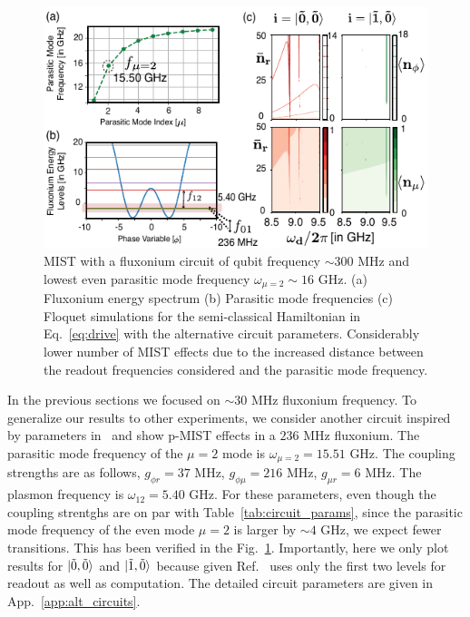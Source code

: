 \documentclass[%
reprint,
superscriptaddress,
 amsmath,amssymb,
 aps,
 prx,
longbibliography,
floatfix,
]{revtex4-2}
\begin{document}
\begin{figure}[htb]
    \centering
    \includegraphics[width=\linewidth]{Figures/Floquet_Will.pdf}
    \caption{MIST with a fluxonium circuit of qubit frequency $\sim 300$ MHz and lowest even parasitic mode frequency $\omega_{\mu=2}\sim 16$ GHz. (a) Fluxonium energy spectrum (b) Parasitic mode frequencies (c) Floquet simulations for the semi-classical Hamiltonian in Eq.~\ref{eq:drive} with the alternative circuit parameters. Considerably lower number of MIST effects due to the increased distance between the readout frequencies considered and the parasitic mode frequency.}
    \label{fig:Floquet1}
\end{figure}

In the previous sections we focused on $\sim 30$ MHz fluxonium frequency. To generalize our results to other experiments, we consider another circuit inspired by parameters in~\cite{ding_high-fidelity_2023} and show p-MIST effects in a $236$ MHz fluxonium. The parasitic mode frequency of the $\mu=2$ mode is $\omega_{\mu=2}=15.51$ GHz. The coupling strengths are as follows, $g_{\phi r}=37$ MHz, $g_{\phi\mu}=216$ MHz, $g_{\mu r}=6$ MHz. The plasmon frequency is $\omega_{12}=5.40$ GHz. For these parameters, even though the coupling strentghs are on par with Table~\ref{tab:circuit_params}, since the parasitic mode frequency of the even mode $\mu=2$ is larger by $\sim 4$ GHz, we expect fewer transitions. This has been verified in the Fig.~\ref{fig:Floquet1}. Importantly, here we only plot results for $\ket{\tilde{0},\tilde{0}}$ and $\ket{\tilde{1},\tilde{0}}$ because given Ref.~\cite{ding_high-fidelity_2023} uses only the first two levels for readout as well as computation. The detailed circuit parameters are given in App.~\ref{app:alt_circuits}. 
\end{document}
